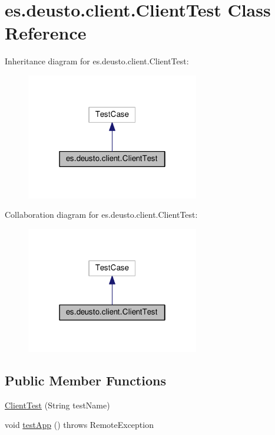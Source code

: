 \hypertarget{classes_1_1deusto_1_1client_1_1_client_test}{}\section{es.\+deusto.\+client.\+Client\+Test Class Reference}
\label{classes_1_1deusto_1_1client_1_1_client_test}


Inheritance diagram for es.\+deusto.\+client.\+Client\+Test\+:\nopagebreak
\begin{figure}[H]
\begin{center}
\leavevmode
\includegraphics[width=214pt]{classes_1_1deusto_1_1client_1_1_client_test__inherit__graph}
\end{center}
\end{figure}


Collaboration diagram for es.\+deusto.\+client.\+Client\+Test\+:\nopagebreak
\begin{figure}[H]
\begin{center}
\leavevmode
\includegraphics[width=214pt]{classes_1_1deusto_1_1client_1_1_client_test__coll__graph}
\end{center}
\end{figure}
\subsection*{Public Member Functions}
\begin{DoxyCompactItemize}
\item 
\hyperlink{classes_1_1deusto_1_1client_1_1_client_test_a452050f3521bf56054ec20630a137e02}{Client\+Test} (String test\+Name)
\item 
void \hyperlink{classes_1_1deusto_1_1client_1_1_client_test_af869b513820b21f952c9754d3aea8d97}{test\+App} ()  throws Remote\+Exception 
\end{DoxyCompactItemize}
